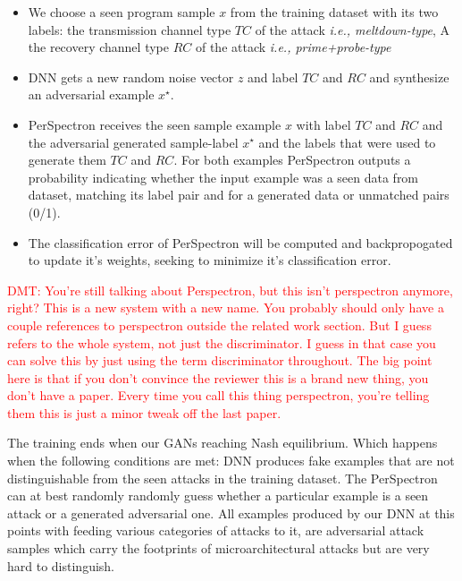 \begin{itemize} [topsep=0pt,parsep=0pt,partopsep=0pt, label={--}, leftmargin=*]
\item We choose a seen program sample $x$ from the training dataset with its two labels: the transmission channel type $TC$ of the attack {\em i.e., meltdown-type}, A the recovery channel type $RC$ of the attack {\em i.e., prime+probe-type} 
 
\item DNN gets a new random noise vector $z$ and label $TC$ and $RC$ and  synthesize an adversarial example  $x^{\star}$.
 
\item PerSpectron receives the seen sample example $x$ with label $TC$ and $RC$ and  the adversarial generated sample-label $x^{\star}$ and the labels that were used to generate them $TC$ and $RC$. For both examples PerSpectron outputs a probability  indicating whether the input example was a seen data from dataset, matching its label pair and  for a generated data or unmatched pairs (0/1). 
 
\item The classification error of PerSpectron will be computed and backpropogated  to update it's weights, seeking to minimize it's classification error. 
 
\end{itemize}

\textcolor{red}{DMT: You're still talking about Perspectron, but this isn't perspectron anymore, right?
This is a new system with a new name.  You probably should only have a couple references to perspectron
outside the related work section.  But I guess \scheme{} refers to the whole system, not just the
discriminator.  I guess in that case you can solve this by just using the term discriminator throughout.
The big point here is that if you don't convince the reviewer this is a brand new thing, you don't have
a paper.  Every time you call this thing perspectron, you're telling them this is just a minor tweak off
the last paper.}

% 
The training ends when our GANs reaching Nash equilibrium. Which happens when the following conditions are met: DNN produces fake examples that are not distinguishable from the seen attacks in the training dataset. The PerSpectron can at best randomly  randomly guess whether a particular example is a seen attack or a generated adversarial one. All examples produced by our DNN at this points with feeding various categories of attacks to it, are adversarial attack samples which carry the footprints of microarchitectural attacks but are very hard to distinguish. 


